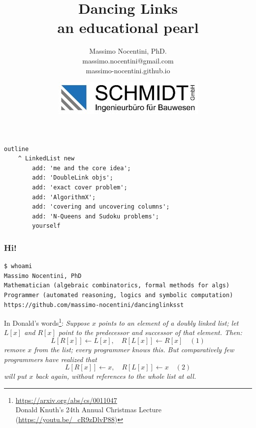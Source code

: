 \documentclass[10pt]{beamer}
\title{Dancing Links\\\small{an educational pearl}}
\author{Massimo Nocentini, PhD.\\
	\footnotesize{massimo.nocentini@gmail.com}\\
	\footnotesize{massimo-nocentini.github.io}}
\institute{ESUG2019, Cologne. -- \today.}
\date{\vspace{0.5cm}\includegraphics{SchmidtLogo.jpg}}
\begin{document}
\frame{\titlepage}


\begin{frame}[fragile]
\frametitle{}
\begin{verbatim}
outline
    ^ LinkedList new
        add: 'me and the core idea';
        add: 'DoubleLink objs';
        add: 'exact cover problem';
        add: 'AlgorithmX';
        add: 'covering and uncovering columns';
        add: 'N-Queens and Sudoku problems';
        yourself
\end{verbatim}
\end{frame}

\begin{frame}[fragile]
\frametitle{Hi!}
\begin{Verbatim}[fontsize=\small]
$ whoami
Massimo Nocentini, PhD
Mathematician (algebraic combinatorics, formal methods for algs)
Programmer (automated reasoning, logics and symbolic computation)
https://github.com/massimo-nocentini/dancinglinksst
\end{Verbatim}
\vfill
In Donald's words\footnote{\url{https://arxiv.org/abs/cs/0011047}\\Donald Knuth's 24th Annual Christmas Lecture (\url{https://youtu.be/_cR9zDlvP88})}:
\emph{
Suppose $x$ points to an element of a doubly linked list;
let $L[x]$ and $R[x]$ point to the predecessor and successor
of that element. Then:
\begin{displaymath}
  L[R[x]] \leftarrow L[x],\quad R[L[x]] \leftarrow R[x] \quad(1)
\end{displaymath}
remove $x$ from the list; every programmer knows this.
But comparatively few programmers have realized that
\begin{displaymath}
  L[R[x]] \leftarrow x,\quad R[L[x]] \leftarrow x \quad(2)
\end{displaymath}
will put $x$ back again, without references to the whole list at all.
}

\end{frame}
\end{document}
